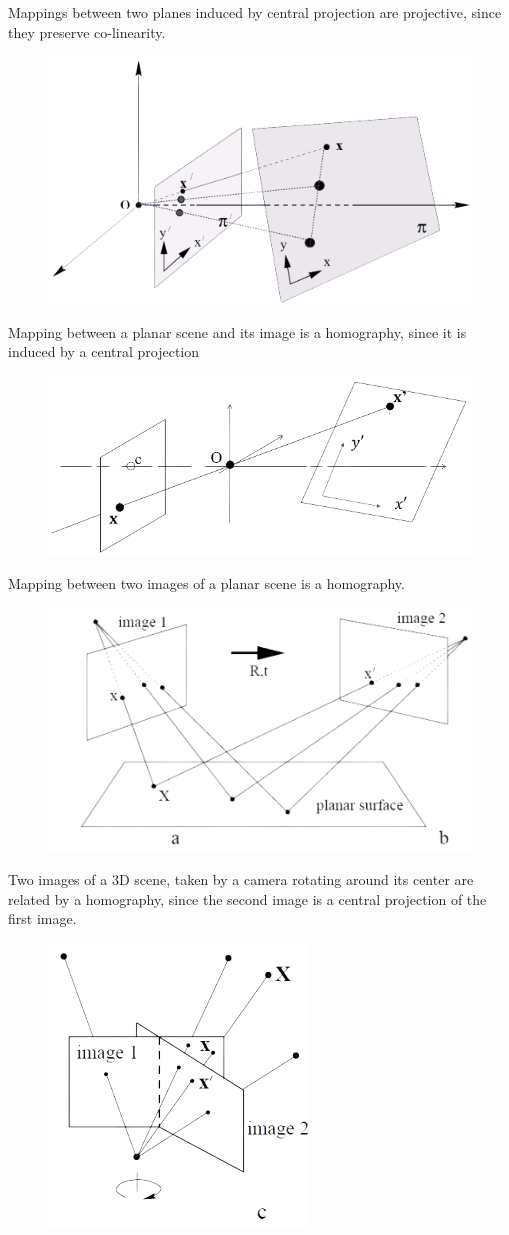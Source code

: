 \documentclass[12pt, a4paper]{report}
\begin{document}
    \begin{example}
        Mappings between two planes induced by central projection are projective, since they preserve co-linearity. 
        \begin{figure}[H]
            \centering
            \includegraphics[width=0.5\linewidth]{images/map1.png}
        \end{figure}
        Mapping between a planar scene and its image is a homography, since it is induced by a central projection
        \begin{figure}[H]
            \centering
            \includegraphics[width=0.5\linewidth]{images/map2.png}
        \end{figure}
        Mapping between two images of a planar scene is a homography.
        \begin{figure}[H]
            \centering
            \includegraphics[width=0.5\linewidth]{images/map3.png}
        \end{figure}
        Two images of a 3D scene, taken by a camera rotating around its center are related by a homography, since the second image is a central projection of the first image. 
        \begin{figure}[H]
            \centering
            \includegraphics[width=0.4\linewidth]{images/map4.png}

\end{figure}
\end{example}
\end{document}
